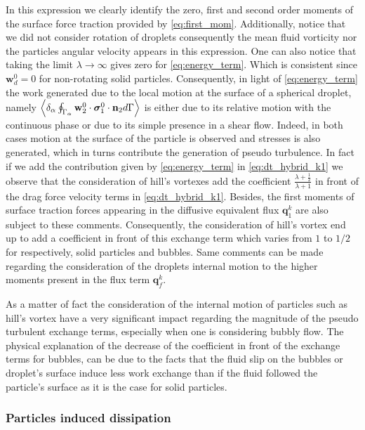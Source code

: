 In this expression we clearly identify the zero, first and second order moments of the surface force traction provided by \ref{eq:first_mom}. 
Additionally, notice that we did not consider rotation of droplets consequently the mean fluid vorticity nor the particles angular velocity appears in this expression. 
One can also notice that taking the limit $\lambda \to \infty$ gives zero for \ref{eq:energy_term}. 
Which is consistent since $\textbf{w}_d^0 = 0$ for non-rotating solid particles. 
Consequently, in light of \ref{eq:energy_term} the work generated due to the local motion at the surface of a spherical droplet, namely  $\left<\delta_\alpha \oint_{\Gamma_{\alpha}} \textbf{w}_2^0 \cdot \bm{\sigma}_1^0\cdot\textbf{n}_2 d\Gamma\right>$ is either due to its relative motion with the continuous phase  or due to its simple presence in a shear flow. 
Indeed, in both cases motion at the surface of the particle is observed and stresses is also generated, which in turns contribute the generation of pseudo turbulence. 
In fact if we add the contribution given by \ref{eq:energy_term} in  \ref{eq:dt_hybrid_k1} we observe that  the consideration of hill's vortexes add the coefficient $\frac{\lambda +\frac{1}{2}}{\lambda+1}$ in front of the drag force velocity terms in \ref{eq:dt_hybrid_k1}.
Besides, the first moments of surface traction forces appearing in the diffusive equivalent flux $\textbf{q}_1^k$ are also subject to these comments.  
Consequently, the consideration of hill's vortex end up to add a coefficient in front of this exchange term which varies from $1$ to $1/2$ for respectively, solid particles and bubbles.  
Same comments can be made regarding the consideration of the droplets internal motion to the higher moments present in the flux term $\textbf{q}^k_f$. 

As a matter of fact the consideration of the internal motion of particles such as hill's vortex have a very significant impact regarding the magnitude of the pseudo turbulent exchange terms, especially when one is considering bubbly flow. 
The physical explanation of the decrease of the coefficient in front of the exchange terms for bubbles, can be due to the facts that the fluid slip on the bubbles or droplet's surface induce less work exchange than if the fluid followed the particle's surface as it is the case for solid particles. 

\subsubsection{Particles induced dissipation}

